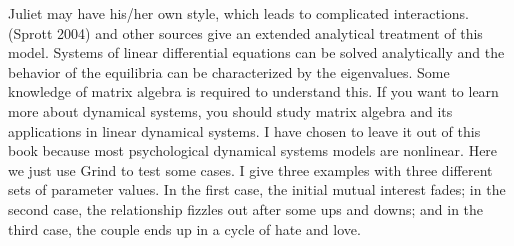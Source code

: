 \documentclass[
  a4paper,
  DIV=11,
  numbers=noendperiod,
  oneside]{scrreprt}
\begin{document}
Juliet may have his/her own style, which leads to complicated
interactions. (Sprott 2004) and other sources give an extended
analytical treatment of this model. Systems of linear differential
equations can be solved analytically and the behavior of the equilibria
can be characterized by the eigenvalues. Some knowledge of matrix
algebra is required to understand this. If you want to learn more about
dynamical systems, you should study matrix algebra and its applications
in linear dynamical systems. I have chosen to leave it out of this book
because most psychological dynamical systems models are nonlinear. Here
we just use Grind to test some cases. I give three examples with three
different sets of parameter values. In the first case, the initial
mutual interest fades; in the second case, the relationship fizzles out
after some ups and downs; and in the third case, the couple ends up in a
cycle of hate and love.
\end{document}
